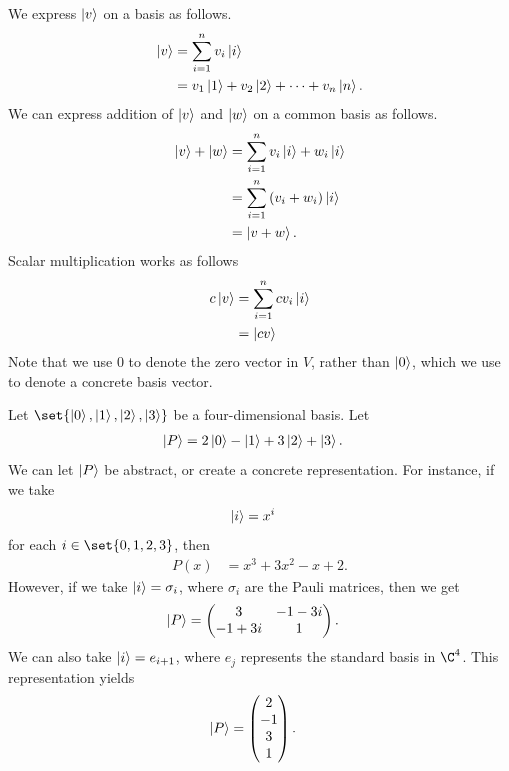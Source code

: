 \documentclass[10pt]{mypackage}
\begin{document}
We express $\ket{v}$ on a basis as follows.
\begin{align*}
  \ket{v} &= \sum_{i=1}^{n}v_i \ket{i}\\
          &= v_1 \ket{1} + v_2 \ket{2} + \cdots + v_n \ket{n}.
\end{align*}
We can express addition of $\ket{v}$ and $ \ket{w} $ on a common basis as follows.
\begin{align*}
  \ket{v} + \ket{w} &= \sum_{i=1}^{n}v_i \ket{i} + w_i \ket{i}\\
                    &= \sum_{i=1}^{n}\left(v_i + w_i\right) \ket{i}\\
                    &= \ket{v+w}.
\end{align*}
Scalar multiplication works as follows
\begin{align*}
  c \ket{v} &= \sum_{i=1}^{n}c v_i \ket{i}\\
            &= \ket{cv}
\end{align*}
Note that we use $0$ to denote the zero vector in $V$, rather than $ \ket{0} $, which we use to denote a concrete basis vector.
\begin{example}
  Let $\set{ \ket{0}, \ket{1}, \ket{2}, \ket{3} }$ be a four-dimensional basis. Let
  \begin{align*}
    \ket{P} &= 2 \ket{0} - \ket{1} + 3 \ket{2} + \ket{3}.
  \end{align*}
  We can let $ \ket{P} $ be abstract, or create a concrete representation. For instance, if we take
  \begin{align*}
    \ket{i} &= x^i
  \end{align*}
  for each $i\in \set{0,1,2,3}$, then
  \begin{align*}
    P(x) &= x^3 + 3x^2 - x + 2.
  \end{align*}
  However, if we take $ \ket{i} = \sigma_i $, where $\sigma_i$ are the Pauli matrices, then we get
  \begin{align*}
    \ket{P} &= \begin{pmatrix}3 & -1-3i\\-1+3i & 1\end{pmatrix}.
  \end{align*}
  We can also take $ \ket{i} = e_{i+1} $, where $e_{j}$ represents the standard basis in $\C^4$. This representation yields
  \begin{align*}
    \ket{P} &= \begin{pmatrix}2\\-1\\3\\1\end{pmatrix}.
  \end{align*}
\end{example}
\end{document}
